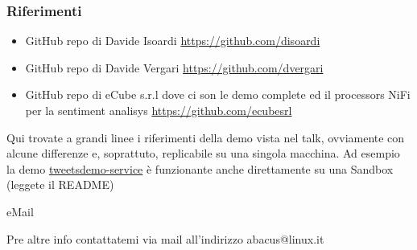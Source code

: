 \documentclass[10pt,xcolor=dvipsnames,flushleft]{beamer}
\begin{document}
\begin{frame}
	\frametitle{Riferimenti}
	\begin{itemize}
		\item GitHub repo di Davide Isoardi \href{https://github.com/disoardi}{https://github.com/disoardi}
		\item GitHub repo di Davide Vergari \href{https://github.com/dvergari}{https://github.com/dvergari}
		\item GitHub repo di eCube s.r.l dove ci son le demo complete ed il processors NiFi per la sentiment analisys \href{https://github.com/ecubesrl}{https://github.com/ecubesrl}
	\end{itemize}
	\begin{block}{}
		\begin{center}
			Qui trovate a grandi linee i riferimenti della demo vista nel talk, ovviamente con alcune differenze e, soprattuto, replicabile su una singola macchina. Ad esempio la demo \href{https://github.com/ecubesrl/tweetsdemo-service}{tweetsdemo-service} è funzionante anche direttamente su una Sandbox (leggete il README)
		\end{center}
	\end{block}
	\begin{block}{eMail}
		\begin{center}
			Pre altre info contattatemi via mail all'indirizzo abacus@linux.it
		\end{center}
	\end{block}

\end{frame}
\end{document}
